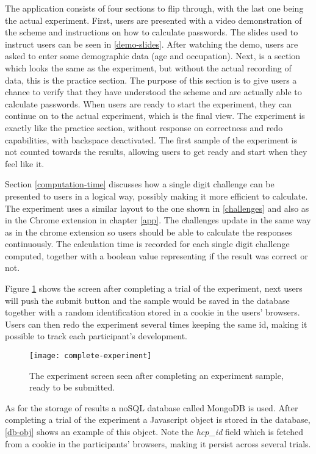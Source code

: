 \par The application consists of four sections to flip through, with the last one being the actual experiment. First, users are presented with a video demonstration of the scheme and instructions on how to calculate passwords. The slides used to instruct users can be seen in \autoref{demo-slides}. After watching the demo, users are asked to enter some demographic data (age and occupation). Next, is a section which looks the same as the experiment, but without the actual recording of data, this is the practice section. The purpose of this section is to give users a chance to verify that they have understood the scheme and are actually able to calculate passwords. When users are ready to start the experiment, they can continue on to the actual experiment, which is the final view. The experiment is exactly like the practice section, without response on correctness and redo capabilities, with backspace deactivated. The first sample of the experiment is not counted towards the results, allowing users to get ready and start when they feel like it. 


\par Section \ref{computation-time} discusses how a single digit challenge can be presented to users in a logical way, possibly making it more efficient to calculate. The experiment uses a similar layout to the one shown in \autoref{challenges} and also as in the Chrome extension in chapter \ref{app}. The challenges update in the same way as in the chrome extension so users should be able to calculate the responses continuously. The calculation time is recorded for each single digit challenge computed, together with a boolean value representing if the result was correct or not. 
\par Figure \ref{complete-experiment} shows the screen after completing a trial of the experiment, next users will push the submit button and the sample would be saved in the database together with a random identification stored in a cookie in the users' browsers. Users can then redo the experiment several times keeping the same id, making it possible to track each participant's development.

\begin{figure}[h]
    \texttt{[image: complete-experiment]}
    \caption{The experiment screen seen after completing an experiment sample, ready to be submitted.}
    \label{complete-experiment}
\end{figure}

\par As for the storage of results a noSQL database called MongoDB is used. After completing a trial of the experiment a Javascript object is stored in the database, \autoref{db-obj} shows an example of this object. Note the \emph{hcp\_id} field which is fetched from a cookie in the participants' browsers, making it persist across several trials. 

